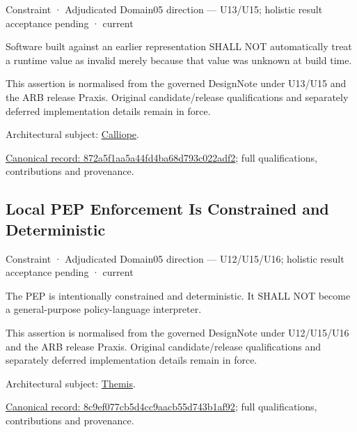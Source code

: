\label{element:872a5f1aa5a44fd4ba68d793c022adf2}
{\small Constraint · Adjudicated Domain05 direction — U13/U15; holistic result acceptance pending · current}\par

Software built against an earlier representation SHALL NOT automatically
treat a runtime value as invalid merely because that value was unknown
at build time.



This assertion is normalised from the governed DesignNote under U13/U15 and the ARB release Praxis. Original candidate/release qualifications and separately deferred implementation details remain in force.



Architectural subject: \hyperref[element:466ad8f75a954c0581b5bba090443849]{Calliope}.


{\footnotesize \href{../../../../continuum/motivation/constraint/872a5f1aa5a44fd4ba68d793c022adf2.md}{Canonical record: 872a5f1aa5a44fd4ba68d793c022adf2}; full qualifications, contributions and provenance.}\par
\subsection{Local PEP Enforcement Is Constrained and Deterministic}

\label{element:8c9ef077cb5d4cc9aacb55d743b1af92}
{\small Constraint · Adjudicated Domain05 direction — U12/U15/U16; holistic result acceptance pending · current}\par

The PEP is intentionally constrained and deterministic. It SHALL NOT become a general-purpose policy-language interpreter.



This assertion is normalised from the governed DesignNote under U12/U15/U16 and the ARB release Praxis. Original candidate/release qualifications and separately deferred implementation details remain in force.



Architectural subject: \hyperref[element:899d34ec491948b68aad09e507dea6d1]{Themis}.


{\footnotesize \href{../../../../continuum/motivation/constraint/8c9ef077cb5d4cc9aacb55d743b1af92.md}{Canonical record: 8c9ef077cb5d4cc9aacb55d743b1af92}; full qualifications, contributions and provenance.}\par
